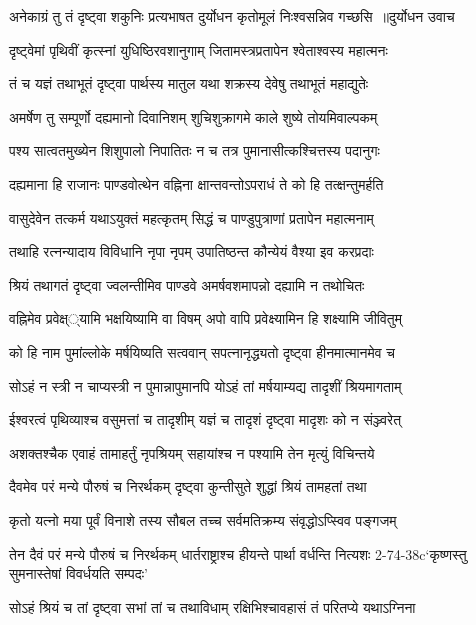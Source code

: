 \twolineshloka
{अनेकाग्रं तु तं दृष्ट्वा शकुनिः प्रत्यभाषत}
{दुर्योधन कृतोमूलं निःश्वसन्निव गच्छसि ॥दुर्योधन उवाच}


\twolineshloka
{दृष्ट्वेमां पृथिवीं कृत्स्नां युधिष्ठिरवशानुगाम्}
{जितामस्त्रप्रतापेन श्वेताश्वस्य महात्मनः}


\twolineshloka
{तं च यज्ञं तथाभूतं दृष्ट्वा पार्थस्य मातुल}
{यथा शक्रस्य देवेषु तथाभूतं महाद्युतेः}


\twolineshloka
{अमर्षेण तु सम्पूर्णो दह्यमानो दिवानिशम्}
{शुचिशुक्रागमे काले शुष्ये तोयमिवाल्पकम्}


\twolineshloka
{पश्य सात्वतमुख्येन शिशुपालो निपातितः}
{न च तत्र पुमानासीत्कश्चित्तस्य पदानुगः}


\twolineshloka
{दह्यमाना हि राजानः पाण्डवोत्थेन वह्निना}
{क्षान्तवन्तोऽपराधं ते को हि तत्क्षन्तुमर्हति}


\twolineshloka
{वासुदेवेन तत्कर्म यथाऽयुक्तं महत्कृतम्}
{सिद्धं च पाण्डुपुत्राणां प्रतापेन महात्मनाम्}


\twolineshloka
{तथाहि रत्नन्यादाय विविधानि नृपा नृपम्}
{उपातिष्ठन्त कौन्येयं वैश्या इव करप्रदाः}


\twolineshloka
{श्रियं तथागतं दृष्ट्वा ज्वलन्तीमिव पाण्डवे}
{अमर्षवशमापन्नो दह्यामि न तथोचितः}


\twolineshloka
{वह्निमेव प्रवेक्ष््यामि भक्षयिष्यामि वा विषम्}
{अपो वापि प्रवेक्ष्यामिन हि शक्ष्यामि जीवितुम्}


\twolineshloka
{को हि नाम पुमांल्लोके मर्षयिष्यति सत्ववान्}
{सपत्नानृद्ध्यतो दृष्ट्वा हीनमात्मानमेव च}


\twolineshloka
{सोऽहं न स्त्री न चाप्यस्त्री न पुमान्नापुमानपि}
{योऽहं तां मर्षयाम्यद्य तादृशीं श्रियमागताम्}


\twolineshloka
{ईश्वरत्वं पृथिव्याश्च वसुमत्तां च तादृशीम्}
{यज्ञं च तादृशं दृष्ट्वा मादृशः को न संञ्ज्वरेत्}


\twolineshloka
{अशक्तश्चैक एवाहं तामाहर्तुं नृपश्रियम्}
{सहायांश्च न पश्यामि तेन मृत्युं विचिन्तये}


\twolineshloka
{दैवमेव परं मन्ये पौरुषं च निरर्थकम्}
{दृष्ट्वा कुन्तीसुते शुद्धां श्रियं तामहतां तथा}


\twolineshloka
{कृतो यत्नो मया पूर्वं विनाशे तस्य सौबल}
{तच्च सर्वमतिक्रम्य संवृद्धोऽप्स्विव पङ्गजम्}


\threelineshloka
{तेन दैवं परं मन्ये पौरुषं च निरर्थकम्}
{धार्तराष्ट्राश्च हीयन्ते पार्था वर्धन्ति नित्यशः}
{2-74-38c`कृष्णस्तु सुमनास्तेषां विवर्धयति सम्पदः'}


\twolineshloka
{सोऽहं श्रियं च तां दृष्ट्वा सभां तां च तथाविधाम्}
{रक्षिभिश्चावहासं तं परितप्ये यथाऽग्निना}



